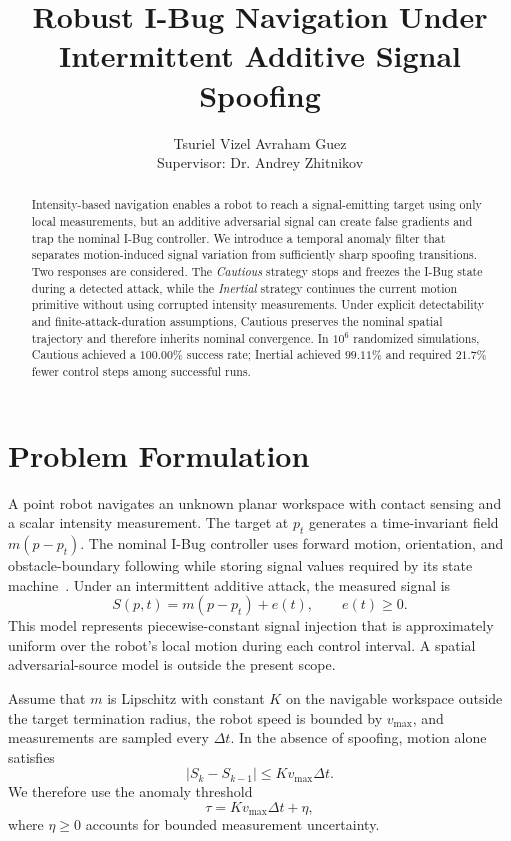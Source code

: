 \documentclass[10pt,a4paper]{article}
\title{\vspace{-1.2em}\textbf{Robust I-Bug Navigation Under Intermittent Additive Signal Spoofing}}
\author{Tsuriel Vizel \qquad Avraham Guez \\[0.5em]
\small Supervisor: Dr. Andrey Zhitnikov}
\date{}
\begin{document}
\maketitle
\vspace{-1.5em}

\begin{abstract}
Intensity-based navigation enables a robot to reach a signal-emitting target using only local measurements, but an additive adversarial signal can create false gradients and trap the nominal I-Bug controller. We introduce a temporal anomaly filter that separates motion-induced signal variation from sufficiently sharp spoofing transitions. Two responses are considered. The \emph{Cautious} strategy stops and freezes the I-Bug state during a detected attack, while the \emph{Inertial} strategy continues the current motion primitive without using corrupted intensity measurements. Under explicit detectability and finite-attack-duration assumptions, Cautious preserves the nominal spatial trajectory and therefore inherits nominal convergence. In $10^6$ randomized simulations, Cautious achieved a $100.00\%$ success rate; Inertial achieved $99.11\%$ and required $21.7\%$ fewer control steps among successful runs.
\end{abstract}

\section{Problem Formulation}
A point robot navigates an unknown planar workspace with contact sensing and a scalar intensity measurement. The target at $p_t$ generates a time-invariant field $m(p-p_t)$. The nominal I-Bug controller uses forward motion, orientation, and obstacle-boundary following while storing signal values required by its state machine~\cite{taylor2009,taylor2014}. Under an intermittent additive attack, the measured signal is
\begin{equation}
S(p,t)=m(p-p_t)+e(t), \qquad e(t)\geq 0.
\label{eq:signal}
\end{equation}
This model represents piecewise-constant signal injection that is approximately uniform over the robot's local motion during each control interval. A spatial adversarial-source model is outside the present scope.

Assume that $m$ is Lipschitz with constant $K$ on the navigable workspace outside the target termination radius, the robot speed is bounded by $v_{\max}$, and measurements are sampled every $\Delta t$. In the absence of spoofing, motion alone satisfies
\begin{equation}
|S_k-S_{k-1}|\leq K v_{\max}\Delta t.
\end{equation}
We therefore use the anomaly threshold
\begin{equation}
\tau=K v_{\max}\Delta t+\eta,
\label{eq:threshold}
\end{equation}
where $\eta\geq0$ accounts for bounded measurement uncertainty.
\end{document}
